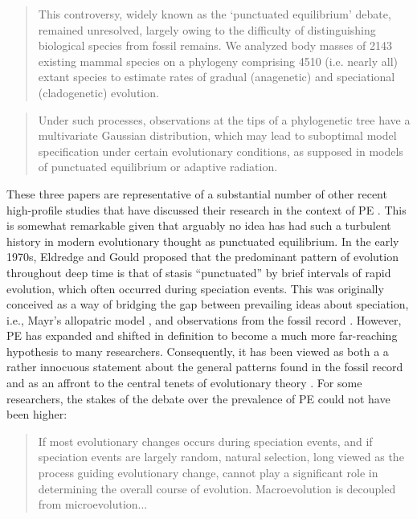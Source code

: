 \begin{quote}
\singlespacing
This controversy, widely known as the `punctuated equilibrium' debate, remained unresolved, largely owing to the difficulty of distinguishing biological species from fossil remains. We analyzed body masses of 2143 existing mammal species on a phylogeny comprising 4510 (i.e. nearly all) extant species to estimate rates of gradual (anagenetic) and speciational (cladogenetic) evolution. \citep[][p. 2195]{Mattila2008}
\end{quote}

\begin{quote}
\singlespacing
Under such processes, observations at the tips of a phylogenetic tree have a multivariate Gaussian distribution, which may lead to suboptimal model specification under certain evolutionary conditions, as supposed in models of punctuated equilibrium or adaptive radiation. \citep[][p. 193]{Landis2012}
\end{quote}
These three papers are representative of a substantial number of other recent high-profile studies that have discussed their research in the context of PE \citep[e.g.,][]{Hunt2007, Hunt2008, Huntetal2008, Webster2003, Bokma2002, Bokma2008, Ingram2011, Uyeda2011, Rabosky2012, Hunt2012, Bartoszek2013, Rabosky2013, Simpson2013, Atkinson2008, Baca2013}. This is somewhat remarkable given that arguably no idea has had such a turbulent history in modern evolutionary thought as punctuated equilibrium. In the early 1970s, Eldredge and Gould \citep{Eldredge1971, EldredgeGould1972, GouldEldredge1977} proposed that the predominant pattern of evolution throughout deep time is that of stasis ``punctuated'' by brief intervals of rapid evolution, which often occurred during speciation events. This was originally conceived as a way of bridging the gap between prevailing ideas about speciation, i.e., Mayr's allopatric model \citeyearpar{Mayr}, and observations from the fossil record \citep{Sepkoskibook}. However, PE has expanded and shifted in definition to become a much more far-reaching hypothesis to many researchers. Consequently, it has been viewed as both a a rather innocuous statement about the general patterns found in the fossil record and as an affront to the central tenets of evolutionary theory \citep{Stanley1975, Stanley1979, Gould1980, Charlesworth1982, Levinton2001}. For some researchers, the stakes of the debate over the prevalence of PE could not have been higher:

\begin{quote}
\singlespacing
If most evolutionary changes occurs during speciation events, and if speciation events are largely random, natural selection, long viewed as the process guiding evolutionary change, cannot play a significant role in determining the overall course of evolution. Macroevolution is decoupled from microevolution... \citep[][p. 648]{Stanley1975}
\end{quote}

